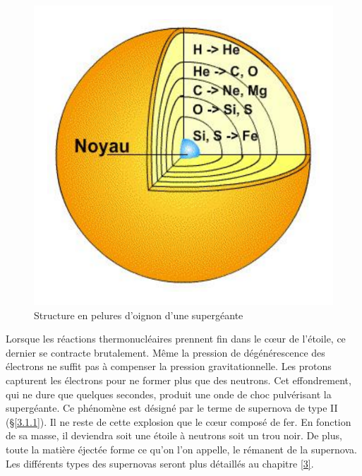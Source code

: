 \begin{figure}[H]
	\centering
	\includegraphics[scale=0.3]{images/oignon}
	\caption[Structure en pelures d'oignon d'une supergéante]{Structure en pelures d'oignon d'une supergéante}
	\label{Fig. 2.6}
\end{figure}\newpage

Lorsque les réactions thermonucléaires prennent fin dans le cœur de l’étoile, ce dernier se contracte brutalement. Même la pression de dégénérescence des électrons ne suffit pas à compenser la pression gravitationnelle. Les protons capturent les électrons pour ne former plus que des neutrons. Cet effondrement, qui ne dure que quelques secondes, produit une onde de choc pulvérisant la supergéante. Ce phénomène est désigné par le terme de supernova de type II (§\ref{3.1.1}). Il ne reste de cette explosion que le cœur composé de fer. En fonction de sa masse, il deviendra soit une étoile à neutrons soit un trou noir. De plus, toute la matière éjectée forme ce qu’on l’on appelle, le rémanent de la supernova. Les différents types des supernovas seront plus détaillés au chapitre \ref{3}.

